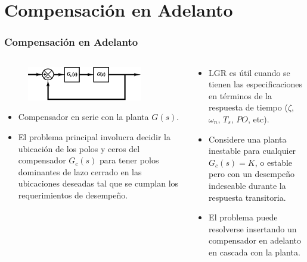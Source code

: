 \documentclass[aspectratio=169,handout]{beamer}
\theoremstyle{definition}
\theoremstyle{plain}
\theoremstyle{remark}
\begin{document}
\section{Compensación en Adelanto}
\begin{frame}[<+->]\frametitle{Compensación en Adelanto}
\begin{columns}
	\begin{column}{0.5\textwidth}
	\begin{figure}
		\includegraphics[width=5cm]{images/controlSystem.eps}
	\end{figure}
	\vspace*{-3mm}
	\begin{itemize}
		\item Compensador en serie con la planta $G(s)$.
		\item El problema principal involucra decidir la ubicación de los polos y ceros del compensador $G_c(s)$ para tener polos dominantes de lazo cerrado en las ubicaciones deseadas tal que se cumplan los requerimientos de desempeño.
	\end{itemize}
	\end{column}
	\begin{column}{0.5\textwidth}
	\begin{itemize}
		\item LGR es útil cuando se tienen las especificaciones en términos de la respuesta de tiempo ($\zeta$, $\omega_n$, $T_s$, $PO$, etc).
		\item Considere una planta inestable para cualquier $G_c(s) = K$, o estable pero con un desempeño indeseable durante la respuesta transitoria.
		\item El problema puede resolverse insertando un compensador en adelanto en cascada con la planta.
	\end{itemize}
	\end{column}
\end{columns}
\end{frame}
\end{document}
